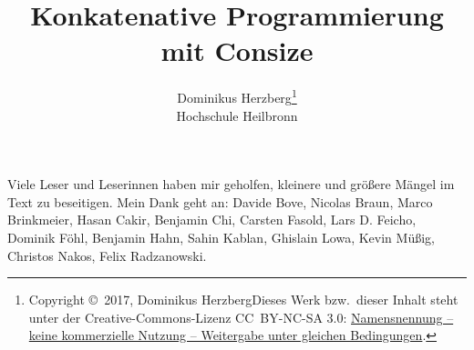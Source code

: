 \documentclass[a4paper]{refrep}
\theoremstyle{plain}
\begin{document}
\title{\bf Konkatenative Programmierung mit Consize}
\author{Dominikus Herzberg\thanks{%
Copyright \copyright\ 2017, Dominikus Herzberg\medskip\newline Dieses Werk bzw.\ dieser Inhalt steht unter der Creative-Commons-Lizenz CC~BY-NC-SA 3.0: \href{http://creativecommons.org/licenses/by-nc-sa/3.0/deed.de}{Namensnennung -- keine kommerzielle Nutzung -- Weitergabe unter gleichen Bedingungen}.}%
\\Hochschule Heilbronn}
\maketitle

Viele Leser und Leserinnen haben mir geholfen, kleinere und größere Mängel im Text zu beseitigen. Mein Dank geht an:
Davide Bove, %
Nicolas Braun, %
Marco Brinkmeier, %
Hasan Cakir, %
Benjamin Chi, %
Carsten Fasold, %
Lars D. Feicho, %
Dominik Föhl, %
Benjamin Hahn, %
Sahin Kablan, %
Ghislain Lowa, %
Kevin Müßig, %
Christos Nakos, %
Felix Radzanowski. %

\newpage

\tableofcontents













\appendix



%
%
\end{document}
